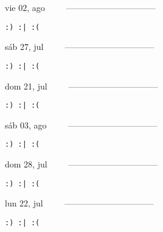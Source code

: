 \documentclass[letterpaper,10pt]{article}
\begin{document}
\begin{multicols}{3}
{vie 02, ago\ \ \ \ \ --------------------------------}
\begin{flushright}\begin{small}\texttt{:) :| :(}\end{small}\end{flushright}
\vfill
{sáb 27, jul\ \ \ \ \ --------------------------------}
\begin{flushright}\begin{small}\texttt{:) :| :(}\end{small}\end{flushright}\par
\vfill
{dom 21, jul\ \ \ \ \ --------------------------------}
\begin{flushright}\begin{small}\texttt{:) :| :(}\end{small}\end{flushright}\par
\vfill
\end{multicols}
\vspace{1.05cm}

\begin{multicols}{3}
{sáb 03, ago\ \ \ \ \ --------------------------------}
\begin{flushright}\begin{small}\texttt{:) :| :(}\end{small}\end{flushright}
\vfill
{dom 28, jul\ \ \ \ \ --------------------------------}
\begin{flushright}\begin{small}\texttt{:) :| :(}\end{small}\end{flushright}\par
\vfill
{lun 22, jul\ \ \ \ \ --------------------------------}
\begin{flushright}\begin{small}\texttt{:) :| :(}\end{small}\end{flushright}\par
\vfill
\end{multicols}
\vspace{1.05cm}
\end{document}
